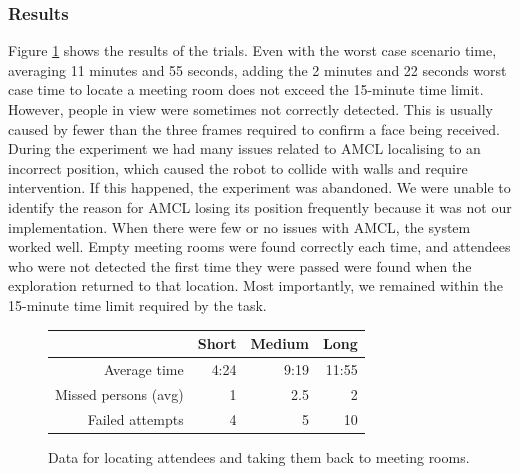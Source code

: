 \documentclass[conference]{IEEEtran}
\begin{document}
\subsubsection{Results}
\label{sec:attendres}
Figure \ref{fig:fullsystem} shows the results of the trials. Even with the worst case scenario time, averaging 11 minutes and 55 seconds, adding the 2 minutes and 22 seconds worst case time to locate a meeting room does not exceed the 15-minute time limit. However, people in view were sometimes not correctly detected. This is usually caused by fewer than the three frames required to confirm a face being received. During the experiment we had many issues related to AMCL localising to an incorrect position, which caused the robot to collide with walls and require intervention. If this happened, the experiment was abandoned. We were unable to identify the reason for AMCL losing its position frequently because it was not our implementation. When there were few or no issues with AMCL, the system worked well. Empty meeting rooms were found correctly each time, and attendees who were not detected the first time they were passed were found when the exploration returned to that location. Most importantly, we remained within the 15-minute time limit required by the task.
\begin{figure}[h]
  \centering
    \begin{tabular}{r|r|r|r|}
    \cline{2-4}
    &Short&Medium&Long\\\hline
    \multicolumn{1}{|r|}{Average time}&4:24&9:19&11:55\\\hline
    \multicolumn{1}{|r|}{Missed persons (avg)}&1&2.5&2\\\hline
    \multicolumn{1}{|r|}{Failed attempts}&4&5&10\\\hline
  \end{tabular}
  \caption{Data for locating attendees and taking them back to meeting rooms.}
  \label{fig:fullsystem}
\end{figure}
\end{document}
